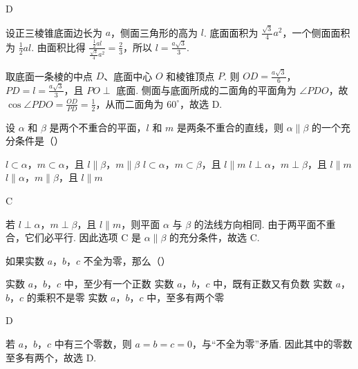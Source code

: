 \begin{answer}D\end{answer}

\begin{solution}
设正三棱锥底面边长为 \(a\)，侧面三角形的高为 \(l\). 底面面积为 \(\frac{\sqrt3}{4}a^{2}\)，一个侧面面积为 \(\frac12al\). 由面积比得 \(\frac{\frac12al}{\frac{\sqrt3}{4}a^{2}}=\frac23\)，所以 \(l=\frac{a\sqrt3}{3}\).

取底面一条棱的中点 \(D\)、底面中心 \(O\) 和棱锥顶点 \(P\). 则 \(OD=\frac{a\sqrt3}{6}\)，\(PD=l=\frac{a\sqrt3}{3}\)，且 \(PO\perp\) 底面. 侧面与底面所成的二面角的平面角为 \(\angle PDO\)，故 \(\cos\angle PDO=\frac{OD}{PD}=\frac12\)，从而二面角为 \(60^{\circ}\)，故选 D.
\end{solution}

\begin{problem}
设 \(\alpha\) 和 \(\beta\) 是两个不重合的平面，\(l\) 和 \(m\) 是两条不重合的直线，则 \(\alpha\parallel\beta\) 的一个充分条件是（\quad）

\choices
{\(l\subset\alpha\)，\(m\subset\alpha\)，且 \(l\parallel\beta\)，\(m\parallel\beta\)}
{\(l\subset\alpha\)，\(m\subset\beta\)，且 \(l\parallel m\)}
{\(l\perp\alpha\)，\(m\perp\beta\)，且 \(l\parallel m\)}
{\(l\parallel\alpha\)，\(m\parallel\beta\)，且 \(l\parallel m\)}
\end{problem}

\begin{answer}C\end{answer}

\begin{solution}
若 \(l\perp\alpha\)，\(m\perp\beta\)，且 \(l\parallel m\)，则平面 \(\alpha\) 与 \(\beta\) 的法线方向相同. 由于两平面不重合，它们必平行. 因此选项 C 是 \(\alpha\parallel\beta\) 的充分条件，故选 C.
\end{solution}

\begin{problem}
如果实数 \(a\)，\(b\)，\(c\) 不全为零，那么（\quad）

\choices
{实数 \(a\)，\(b\)，\(c\) 中，至少有一个正数}
{实数 \(a\)，\(b\)，\(c\) 中，既有正数又有负数}
{实数 \(a\)，\(b\)，\(c\) 的乘积不是零}
{实数 \(a\)，\(b\)，\(c\) 中，至多有两个零}
\end{problem}

\begin{answer}D\end{answer}

\begin{solution}
若 \(a\)，\(b\)，\(c\) 中有三个零数，则 \(a=b=c=0\)，与“不全为零”矛盾. 因此其中的零数至多有两个，故选 D.
\end{solution}

